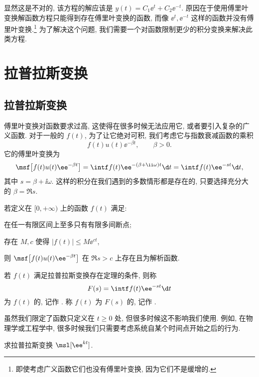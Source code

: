 显然这是不对的, 该方程的解应该是 $y(t)=C_1\ee^t+C_2\ee^{-t}$.
原因在于使用傅里叶变换解函数方程只能得到存在傅里叶变换的函数, 而像 $\ee^t,\ee^{-t}$ 这样的函数并没有傅里叶变换.\footnote{
  即使考虑广义函数它们也没有傅里叶变换, 因为它们不是缓增的.
}
为了解决这个问题, 我们需要一个对函数限制更少的积分变换来解决此类方程.





\section{拉普拉斯变换}

\subsection{拉普拉斯变换}

傅里叶变换对函数要求过高, 这使得在很多时候无法应用它, 或者要引入复杂的广义函数.
对于一般的 $f(t)$, 为了让它绝对可积, 我们考虑它与指数衰减函数的乘积
\[
  f(t)u(t)\ee^{-\beta t},\qquad\beta>0.
\]
它的傅里叶变换为
\[
   \msf\bigl[f(t)u(t)\ee^{-\beta t}\bigr]
  =\intf f(t)\ee^{-(\beta+\ii \omega)t}\d t
  =\intf f(t)\ee^{-st}\d t,
\]
其中 $s=\beta+\ii \omega$.
这样的积分在我们遇到的多数情形都是存在的, 只要选择充分大的 $\beta=\Re s$.

\begin{theorem}[拉普拉斯变换存在定理]
  若定义在 $[0,+\infty)$ 上的函数 $f(t)$ 满足:
  \begin{enuma}
    \item 在任一有限区间上至多只有有限多间断点;
    \item 存在 $M,c$ 使得 $|f(t)|\le M\ee^{ct}$,
  \end{enuma}\par\noindent
  则 $\msf\bigl[f(t)u(t)\ee^{-\beta t}\bigr]$ 在 $\Re s>c$ 上存在且为解析函数.
\end{theorem}

\begin{definition}
  若 $f(t)$ 满足拉普拉斯变换存在定理的条件, 则称
  \[
    F(s)=\intf f(t)\ee^{-st}\d t
  \]
  为 $f(t)$ 的, 记作 \noun{$\msl[f(t)]$}.
  称 $f(t)$ 为 $F(s)$ 的, 记作 .
\end{definition}

虽然我们限定了函数只定义在 $t\ge 0$ 处, 但很多时候这不影响我们使用.
例如, 在物理学或工程学中, 很多时候我们只需要考虑系统自某个时间点开始之后的行为.

\begin{example}
  求拉普拉斯变换 $\msl[\ee^{kt}]$.
\end{example}


